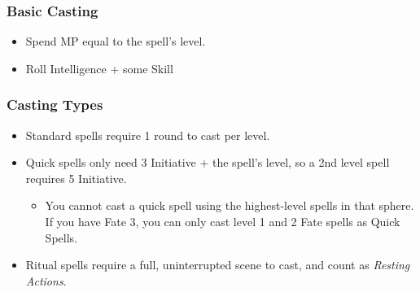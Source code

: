 \begin{multicols}{2}
\subsubsection{Basic Casting}

\begin{itemize}

	\item{Spend MP equal to the spell's level.}
	\item{Roll Intelligence + some Skill}

\end{itemize}

\subsubsection{Casting Types}

\begin{itemize}

	\item{Standard spells require 1 round to cast per level.}
	\item{Quick spells only need 3 Initiative + the spell's level, so a 2nd level spell requires 5 Initiative.}
	\begin{itemize}
		\item{You cannot cast a quick spell using the highest-level spells in that sphere.  If you have Fate 3, you can only cast level 1 and 2 Fate spells as Quick Spells.}
	\end{itemize}
	\item{Ritual spells require a full, uninterrupted scene to cast, and count as \textit{Resting Actions}.}

\end{itemize}

\end{multicols}
